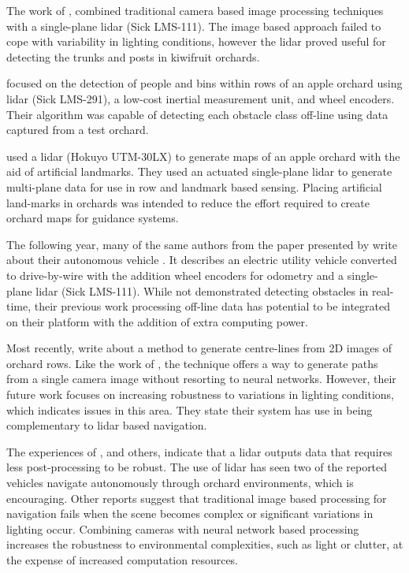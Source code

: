 \documentclass[preprint,authoryear,12pt]{elsarticle}
\begin{document}
        The work of \cite{Scarfe2012}, combined traditional camera based image processing techniques with a single-plane lidar (Sick LMS-111).
        The image based approach failed to cope with variability in lighting conditions, however the lidar proved useful for detecting the trunks and posts in kiwifruit orchards.

        \cite{Freitas2012} focused on the detection of people and bins within rows of an apple orchard using lidar (Sick LMS-291), a low-cost inertial measurement unit, and wheel encoders.
        Their algorithm was capable of detecting each obstacle class off-line using data captured from a test orchard.

        \cite{Zhang2014} used a lidar (Hokuyo UTM-30LX) to generate maps of an apple orchard with the aid of artificial landmarks.
        They used an actuated single-plane lidar to generate multi-plane data for use in row and landmark based sensing.
        Placing artificial land-marks in orchards was intended to reduce the effort required to create orchard maps for guidance systems.

        The following year, many of the same authors from  the paper presented by \cite{Zhang2014} write about their autonomous vehicle \citep{Bergerman2015}.
        It describes an electric utility vehicle converted to drive-by-wire with the addition wheel encoders for odometry and a single-plane lidar (Sick LMS-111).
        While not demonstrated detecting obstacles in real-time, their previous work processing off-line data \citep{Freitas2012} has potential to be integrated on their platform with the addition of extra computing power.

        Most recently, \cite{Sharifi2015} write about a method to generate centre-lines from 2D images of orchard rows.
        Like the work of \cite{He2011}, the technique offers a way to generate paths from a single camera image without resorting to neural networks.
        However, their future work focuses on increasing robustness to variations in lighting conditions, which indicates issues in this area.
        They state their system has use in being complementary to lidar based navigation.

        The experiences of \cite{Scarfe2012}, and others, indicate that a lidar outputs data that requires less post-processing to be robust.
        The use of lidar has seen two of the reported vehicles navigate autonomously through orchard environments, which is encouraging.
        Other reports suggest that traditional image based processing for navigation fails when the scene becomes complex or significant variations in lighting occur.
        Combining cameras with neural network based processing increases the robustness to environmental complexities, such as light or clutter, at the expense of increased computation resources.
\end{document}
